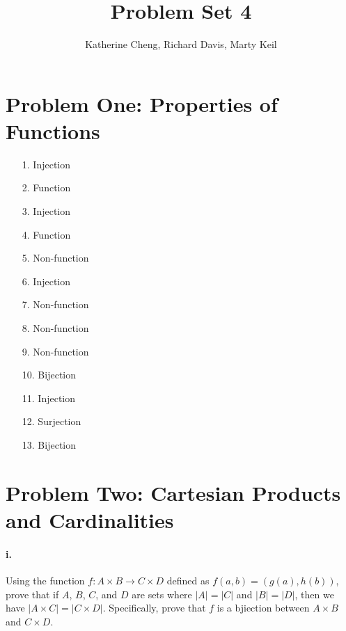 \documentclass[10pt,letter]{article}
\begin{document}

\title{Problem Set 4}

\author{Katherine Cheng, Richard Davis, Marty Keil}

 
\maketitle 

\section*{Problem One: Properties of Functions}

\begin{enumerate}
\item[1.] Injection
\item[2.] Function
\item[3.] Injection
\item[4.] Function
\item[5.] Non-function
\item[6.] Injection
\item[7.] Non-function
\item[8.] Non-function
\item[9.] Non-function
\item[10.] Bijection
\item[11.] Injection
\item[12.] Surjection
\item[13.] Bijection
\end{enumerate}

\section*{Problem Two: Cartesian Products and Cardinalities}

\paragraph{i.} Using the function $f: A \times B \rightarrow C \times D$ defined as $f(a, b) = (g(a), h(b))$, prove that if $A$, $B$, $C$, and $D$ are sets where $|A| = |C|$ and $|B| = |D|$, then we have $|A \times C| = |C \times D|$. Specifically, prove that $f$ is a bjiection between $A \times B$ and $C \times D$. 
\end{document}
